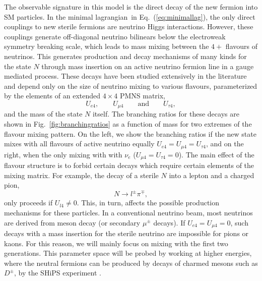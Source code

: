 \documentclass[11pt, a4paper]{article}
\newcommand{\refeq}[1]{Eq.~(\ref{#1})}
\newcommand{\reffig}[1]{Fig.~\ref{#1}}
\def\lagrangian{lagrangian}
\begin{document}
The observable signature in this model is the direct decay of the new fermion
into SM particles. In the minimal \lagrangian\ in \refeq{eq:minimallag}, the
only direct couplings to new sterile fermions are neutrino Higgs interactions.
However, these couplings generate off-diagonal neutrino bilinears below the
electroweak symmetry breaking scale, which leads to mass mixing between the
$4+$ flavours of neutrinos. This generates production and decay mechanisms of
many kinds for the state $N$ through mass insertion on an active neutrino
fermion line in a gauge mediated process. These decays have been studied
extensively in the literature \cite{Atre:2009rg} and depend only on the size of
neutrino mixing to various flavours, parameterized by the elements of an
extended $4\times4$ PMNS matrix,
%
\[ U_{e4}, \qquad U_{\mu 4} \qquad \text{and} \qquad U_{\tau 4},  \]
%
and the mass of the state $N$ itself. The branching ratios for these decays are
shown in \reffig{fig:branchingratios} as a function of mass for two extremes of
the flavour mixing pattern. On the left, we show the branching ratios if the
new state mixes with all flavours of active neutrino equally $U_{e4}=U_{\mu
4}=U_{\tau 4}$, and on the right, when the only mixing with with $\nu_e$
($U_{\mu 4}=U_{\tau 4} = 0$). The main effect of the flavour structure is to
forbid certain decays which require certain elements of the mixing matrix. For
example, the decay of a sterile $N$ into a lepton and a charged pion,
%
\[ N \to l^\pm \pi^\mp,   \]
%
only proceeds if $U_{l4}\neq 0$. This, in turn, affects the possible production
mechanisms for these particles. In a conventional neutrino beam, most neutrinos
are derived from meson decay (or secondary $\mu^\pm$ decays). If $U_{e4}=U_{\mu
4}=0$, such decays with a mass insertion for the sterile neutrino are
impossible for pions or kaons. For this reason, we will mainly focus on mixing
with the first two generations. This parameter space will be probed by working
at higher energies, where the neutral fermions can be produced by decays of
charmed mesons such as $D^\pm$, by the SHiPS experiment \cite{Alekhin:2015byh, Anelli:2015pba}.
 
\end{document}
